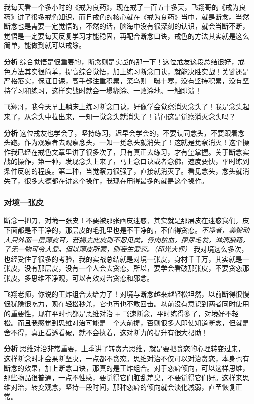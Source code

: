 \begin{case}
    我每天看一个多小时的《戒为良药》，现在戒了一百五十多天，飞翔哥的《戒为良药》讲了很多戒色知识，而且戒色的核心就在《戒为良药》当中，就是断念。当然断念也是需要一定觉悟的，不然的话，脑海中没有很深刻的认识，就会当断不断，觉悟是一定要每天反复学习才能稳固，再配合断念口诀，戒色的方法其实就是这么简单，能做到就可以戒除。

    \textbf{分析} 综合觉悟是很重要的，断念则是实战的那一下！这位戒友这段总结很好，戒色方法其实很简单，提高综合觉悟，加上练习断念口诀，就能决胜实战！关键还是严格落实，保证日课，高手都注重积累，菜鸟则一曝十寒，没有坚持积累，没有坚持学习和练习，这样实战时就会一塌糊涂、一败涂地、一触即溃！
\end{case}

\begin{case}
    飞翔哥，我今天早上躺床上练习断念口诀，好像学会觉察消灭念头了！我是念头起来了，从念头中拉出来，一知一觉念头就消失了！请问这是觉察消灭念头吗？

    \textbf{分析} 这位戒友也学会了，坚持练习，迟早会学会的，不要认同念头，不要跟着念头跑，作为观察者去观察念头，一知一觉念头就消失了！这就是觉察消灭！这个操作我已经在戒色文章里讲了很多次了，只有真正去练习，才有望掌握。关于断念实战的操作，第一种，发现念头上来了，马上念口诀或者念佛，速度要快，平时练到条件反射的程度。第二种，当觉察力很强了，直接就消灭了。看见念头，念头就消失了，很多大德都在讲这个操作，我现在用得最多的就是这个操作。
\end{case}

\subsubsection{对境一张皮}

断念一把刀，对境一张皮！不要被那张画皮迷惑，其实就是那层皮在迷惑我们，皮下面都是不干净的，那层皮的毛孔里也是不干净的，不值得贪恋。\textit{不净者，美貌动人只外面一层薄皮耳，若揭去此皮则不忍见矣。骨肉脓血，屎尿毛发，淋漓狼藉，了无一物可令人爱。但以薄皮所蒙，则妄生爱恋。（印光大师）} 我对境这么多次，也经受住了很多的考验，我的实战总结就是对境一张皮，身材千千万，其实就是一张皮，没有那层皮，没有一个人会去贪恋。所以，要学会看破那张皮，不要贪恋那张皮。多思维不净观，可以有效对治贪恋和邪念。

\begin{case}
    飞翔老师，你说的王炸组合太给力了！对境与断念越来越轻松坦然，以前断得很慢很犹豫很吃力，现在轻松秒杀，它也再也不敢回击。以前没有意识到两者同时使用的重要性，现在平时也都是思维对治 + 飞速断念，平时练得多了，对境好不轻松。而且我感觉到思维对治可能是一个大前提，否则很多人即使知道断念，但就是舍不得，真正看透看破，就不会执着，这对断力的提升有很大帮助！

    \textbf{分析} 思维对治非常重要，上季讲了转贪六思维，就是要把贪恋的心理转变过来，这样断念时才会果断坚决，一点都不贪恋。思维对治不仅可以对治贪恋，本身也有断念的效果，加上断念口诀，那真的是王炸组合。对于恋癖倾向，可以这样思维，那些物品很普通，一点不性感，要觉得它们脏乱差臭，不要觉得它们好。这样来思维对治，转变观念，坚持一段时间，那种恋癖的倾向就会淡化减弱，直至恢复正常。
\end{case}

